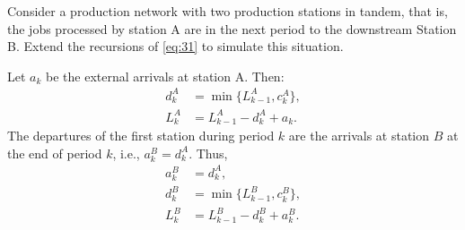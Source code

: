 \begin{exercise}
  Consider a production network with two production stations in
  tandem, that is, the jobs processed by station A are in the next
  period to the downstream Station B.  Extend the recursions of
  \eqref{eq:31} to simulate this situation.
\begin{solution}
  Let $a_k$ be the external arrivals at station A. Then:
\begin{equation}
  \begin{split}
    d^A_k &= \min\{L_{k-1}^A, c_k^A\}, \\
    L_k^A &= L_{k-1}^A -d_k^A + a_k.
  \end{split}
\end{equation}
The departures of the first station during period $k$ are the arrivals
at station $B$ at the end of period $k$, i.e., $a_k^B =
d_{k}^A$. Thus,
\begin{equation}
  \begin{split}
    a_k^B &= d_{k}^A,\\
    d^B_k &= \min\{L_{k-1}^B, c_k^B\}, \\
    L_k^B &= L_{k-1}^B -d_k^B + a_k^B.
  \end{split}
\end{equation}
\end{solution}
\end{exercise}

